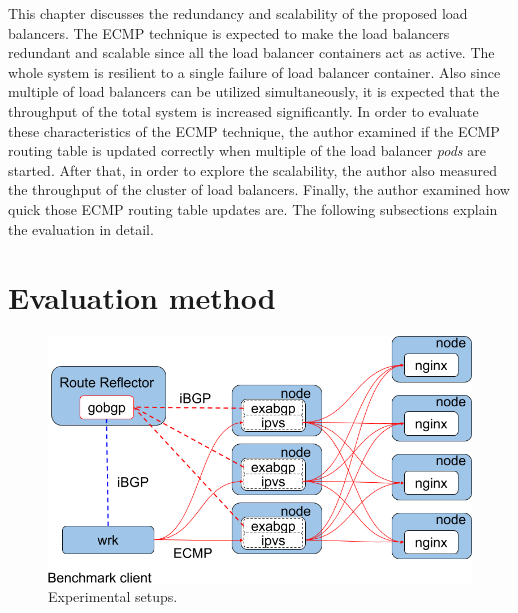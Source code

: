 This chapter discusses the redundancy and scalability of the proposed load balancers.
The ECMP technique is expected to make the load balancers redundant and scalable since all the load balancer containers act as active.
The whole system is resilient to a single failure of load balancer container.
Also since multiple of load balancers can be utilized simultaneously, it is expected that the throughput of the total system is increased significantly.
In order to evaluate these characteristics of the ECMP technique,
the author examined if the ECMP routing table is updated correctly when multiple of the load balancer {\em pods} are started.
After that, in order to explore the scalability, the author also measured the throughput of the cluster of load balancers.
Finally, the author examined how quick those ECMP routing table updates are.
The following subsections explain the evaluation in detail.

\section{Evaluation method}

\begin{figure}[b]
  \centering
    \includegraphics[width=0.9\columnwidth]{Figs/lb_ecmp_schem}
    \caption{Experimental setups.}
    \label{fig:lb_ecmp_schem}
\end{figure}

